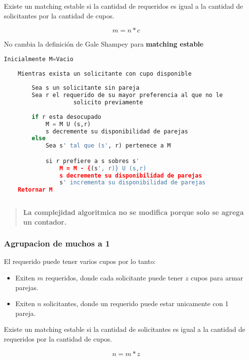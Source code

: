 \documentclass{article}
\begin{document}
Existe un matching estable si la cantidad de requeridos es igual a la cantidad de solicitantes por la cantidad de cupos.

\begin{equation} \label{eu_eqn}
    m=n*c
\end{equation}

No cambia la definición de Gale Shampey para \textbf{matching estable}

\begin{lstlisting}[language=Python, caption=Algoritmo de solicitantes con cupos]
    Inicialmente M=Vacio
    
    Mientras exista un solicitante con cupo disponible
    
        Sea s un solicitante sin pareja
        Sea r el requerido de su mayor preferencia al que no le
                    solicito previamente
            
        if r esta desocupado
            M = M U (s,r)
            s decremente su disponibilidad de parejas
        else
            Sea s' tal que (s', r) pertenece a M

            si r prefiere a s sobres s'
                M = M - {(s', r)} U (s,r)
                s decremente su disponibilidad de parejas
                s' incrementa su disponibilidad de parejas
    Retornar M
    
\end{lstlisting}    
\begin{quote}
    \textbf{La complejidad algoritmica no se modifica porque solo se agrega un contador.}
\end{quote}


\subsubsection{Agrupacion de muchos a 1}
El requerido puede tener varios cupos por lo tanto:
\begin{itemize}
    \item Exiten \(m\) requeridos, donde cada solicitante puede tener \(z\) cupos para armar parejas.
    \item Exiten \(n\) solicitantes, donde un requerido puede estar unicamente con 1 pareja.
\end{itemize}

Existe un matching estable si la cantidad de solicitantes es igual a la cantidad de requeridos por la cantidad de cupos.

\begin{equation} \label{eu_eqn}
    n=m*z
\end{equation}
\end{document}
